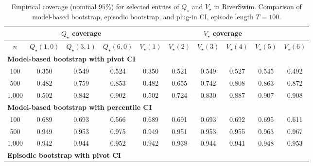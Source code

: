\documentclass{article}
\numberwithin{equation}{section}
\begin{document}
\begin{table}[ht]
\centering
\caption{Empirical coverage (nominal $95\%$) for selected entries of $Q_\star$ and $V_\star$ in RiverSwim. Comparison of model-based bootstrap, episodic bootstrap, and plug-in CI, episode length $T=100$.}
\label{tab:riverswim-optimal-coverage-T100}
\begin{tabular}{c|ccc|cccccc}
\hline
& \multicolumn{3}{c|}{$Q_\star$ coverage} & \multicolumn{6}{c}{$V_\star$ coverage} \\ \hline
$n$
& $Q_\star(1,0)$ & $Q_\star(3,1)$ & $Q_\star(6,0)$
& $V_\star(1)$ & $V_\star(2)$ & $V_\star(3)$ & $V_\star(4)$ & $V_\star(5)$ & $V_\star(6)$ \\
\hline
\multicolumn{10}{l}{\textbf{Model-based bootstrap with pivot CI}} \\ \hline
100
& 0.350 & 0.549 & 0.524
& 0.350 & 0.521 & 0.549 & 0.527 & 0.545 & 0.492 \\
500
& 0.482 & \cellcolor{covheat!5!white}0.759 & \cellcolor{covheat!52!white}0.853
& 0.482 & 0.655 & 0.742 & \cellcolor{covheat!29!white}0.808 & \cellcolor{covheat!57!white}0.863 & \cellcolor{covheat!61!white}0.872 \\
1{,}000
& 0.502 & \cellcolor{covheat!46!white}0.842 & \cellcolor{covheat!76!white}0.902
& 0.502 & 0.724 & \cellcolor{covheat!40!white}0.830 & \cellcolor{covheat!69!white}0.887 & \cellcolor{covheat!79!white}0.907 & \cellcolor{covheat!79!white}0.908 \\
\hline
\multicolumn{10}{l}{\textbf{Model-based bootstrap with percentile CI}} \\ \hline
100
& 0.689 & 0.693 & 0.566
& 0.689 & 0.691 & 0.693 & 0.692 & 0.695 & 0.611 \\
500
& \cellcolor{covheat!100!white}0.949 & \cellcolor{covheat!100!white}0.953 & \cellcolor{covheat!100!white}0.975
& \cellcolor{covheat!100!white}0.949 & \cellcolor{covheat!100!white}0.951 & \cellcolor{covheat!100!white}0.953 & \cellcolor{covheat!100!white}0.955 & \cellcolor{covheat!100!white}0.963 & \cellcolor{covheat!100!white}0.967 \\
1{,}000
& \cellcolor{covheat!96!white}0.942 & \cellcolor{covheat!97!white}0.944 & \cellcolor{covheat!100!white}0.952
& \cellcolor{covheat!96!white}0.942 & \cellcolor{covheat!94!white}0.938 & \cellcolor{covheat!97!white}0.944 & \cellcolor{covheat!96!white}0.941 & \cellcolor{covheat!99!white}0.948 & \cellcolor{covheat!100!white}0.953 \\
\hline
\multicolumn{10}{l}{\textbf{Episodic bootstrap with pivot CI}} \\ \hline

\end{tabular}
\end{table}
\end{document}
